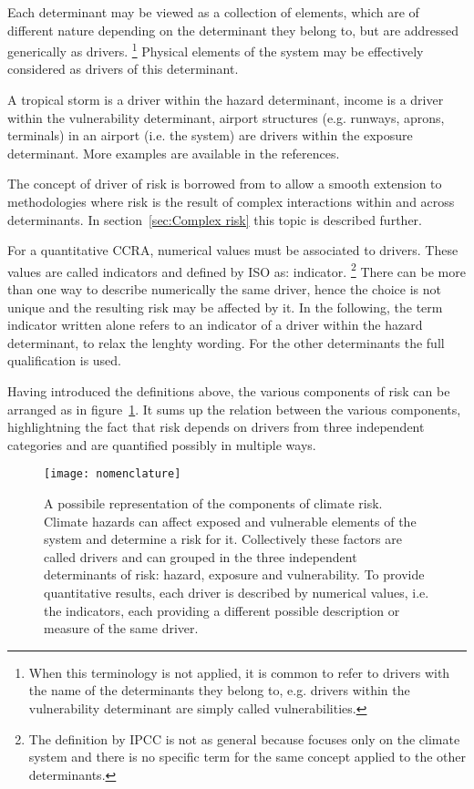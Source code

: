 Each \gls{determinant} may be viewed as a collection of elements, which are of different nature depending on the \gls{determinant} they belong to, but are addressed generically as \glspl{driver}.%
\footnote{When this terminology is not applied, it is common to refer to \glspl{driver} with the name of the \glspl{determinant} they belong to, e.g. drivers within the \gls{vulnerability} determinant are simply called vulnerabilities.}
Physical elements of the system may be effectively considered as \Glspl{driver} of this \gls{determinant}.
\begin{example}
  A tropical storm is a \gls{driver} within the \gls{hazard} \gls{determinant},\cite[15]{2017GIZRiskSupplement} income is a \gls{driver} within the \gls{vulnerability} \gls{determinant},\cite[493]{2021SimpsonAFramework} airport structures (e.g. runways, aprons, terminals) in an airport (i.e. the system) are \glspl{driver} within the \gls{exposure} \gls{determinant}.\cite[551]{2022DeVivoRiskAssessment} More examples are available in the references.
\end{example}
The concept of \gls{driver} of \gls{risk} is borrowed from \cite{2021SimpsonAFramework} to allow a smooth extension to methodologies where \gls{risk} is the result of complex interactions within and across \glspl{determinant}. In section~\ref{sec:Complex risk} this topic is described further.

For a quantitative \gls{CCRA}, numerical values must be associated to \glspl{driver}. These values are called \glspl{indicator} and defined by \gls{ISO} as: \glsdesc{indicator}.%
\footnote{The definition by \gls{IPCC} is not as general because focuses only on the climate system and there is no specific term for the same concept applied to the other \glspl{determinant}.}
There can be more than one way to describe numerically the same \gls{driver}, hence the choice is not unique and the resulting risk may be affected by it.
In the following, the term \gls{indicator} written alone refers to an \gls{indicator} of a \gls{driver} within the \gls{hazard} \gls{determinant}, to relax the lenghty wording. For the other \glspl{determinant} the full qualification is used.

Having introduced the definitions above, the various components of \gls{risk} can be arranged as in figure~\ref{fig:nomenclature}. It sums up the relation between the various components, highlightning the fact that risk depends on drivers from three independent categories and are quantified possibly in multiple ways.
\begin{figure}[h]
  \centering
  \texttt{[image: nomenclature]}
  \caption{A possibile representation of the components of climate risk. Climate hazards can affect exposed and vulnerable elements of the system and determine a risk for it. Collectively these factors are called drivers and can grouped in the three independent determinants of risk: hazard, exposure and vulnerability. To provide quantitative results, each driver is described by numerical values, i.e. the indicators, each providing a different possible description or measure of the same driver.}
  \label{fig:nomenclature}
\end{figure}



